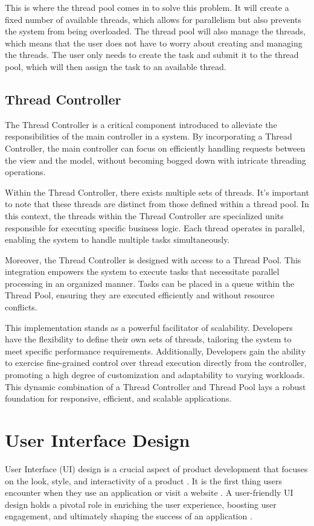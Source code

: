 This is where the thread pool comes in to solve this problem. It will create a fixed number of available threads, which allows for parallelism but also prevents the system from being overloaded. The thread pool will also manage the threads, which means that the user does not have to worry about creating and managing the threads. The user only needs to create the task and submit it to the thread pool, which will then assign the task to an available thread.

\subsection{Thread Controller}
\label{subsec:thread-controller}

The Thread Controller is a critical component introduced to alleviate the responsibilities of the main controller in a system. By incorporating a Thread Controller, the main controller can focus on efficiently handling requests between the view and the model, without becoming bogged down with intricate threading operations.

Within the Thread Controller, there exists multiple sets of threads. It's important to note that these threads are distinct from those defined within a thread pool. In this context, the threads within the Thread Controller are specialized units responsible for executing specific business logic. Each thread operates in parallel, enabling the system to handle multiple tasks simultaneously.

Moreover, the Thread Controller is designed with access to a Thread Pool. This integration empowers the system to execute tasks that necessitate parallel processing in an organized manner. Tasks can be placed in a queue within the Thread Pool, ensuring they are executed efficiently and without resource conflicts.

This implementation stands as a powerful facilitator of scalability. Developers have the flexibility to define their own sets of threads, tailoring the system to meet specific performance requirements. Additionally, Developers gain the ability to exercise fine-grained control over thread execution directly from the controller, promoting a high degree of customization and adaptability to varying workloads. This dynamic combination of a Thread Controller and Thread Pool lays a robust foundation for responsive, efficient, and scalable applications.


\section{User Interface Design}
User Interface (UI) design is a crucial aspect of product development that focuses on the look, style, and interactivity of a product \cite{Coursera_2023}. It is the first thing users encounter when they use an application or visit a website \cite{Coursera_2023}.
A user-friendly UI design holds a pivotal role in enriching the user experience, boosting user engagement, and ultimately shaping the success of an application \cite{AlgoRepublic_2023}.

